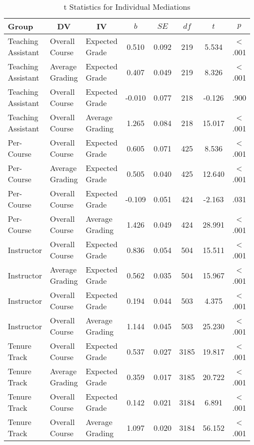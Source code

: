 \documentclass[man]{apa6}
\theoremstyle{definition}
\theoremstyle{definition}
\theoremstyle{definition}
\theoremstyle{remark}
\begin{document}
\begin{table}[tbp]
\begin{center}
\begin{threeparttable}
\caption{\label{tab:table-med-split}t Statistics for Individual Mediations}
\begin{tabular}{lllccccc}
\toprule
Group & \multicolumn{1}{c}{DV} & \multicolumn{1}{c}{IV} & \multicolumn{1}{c}{$b$} & \multicolumn{1}{c}{$SE$} & \multicolumn{1}{c}{$df$} & \multicolumn{1}{c}{$t$} & \multicolumn{1}{c}{$p$}\\
\midrule
Teaching Assistant & Overall Course & Expected Grade & 0.510 & 0.092 & 219 & 5.534 & < .001\\
Teaching Assistant & Average Grading & Expected Grade & 0.407 & 0.049 & 219 & 8.326 & < .001\\
Teaching Assistant & Overall Course & Expected Grade & -0.010 & 0.077 & 218 & -0.126 & .900\\
Teaching Assistant & Overall Course & Average Grading & 1.265 & 0.084 & 218 & 15.017 & < .001\\
Per-Course & Overall Course & Expected Grade & 0.605 & 0.071 & 425 & 8.536 & < .001\\
Per-Course & Average Grading & Expected Grade & 0.505 & 0.040 & 425 & 12.640 & < .001\\
Per-Course & Overall Course & Expected Grade & -0.109 & 0.051 & 424 & -2.163 & .031\\
Per-Course & Overall Course & Average Grading & 1.426 & 0.049 & 424 & 28.991 & < .001\\
Instructor & Overall Course & Expected Grade & 0.836 & 0.054 & 504 & 15.511 & < .001\\
Instructor & Average Grading & Expected Grade & 0.562 & 0.035 & 504 & 15.967 & < .001\\
Instructor & Overall Course & Expected Grade & 0.194 & 0.044 & 503 & 4.375 & < .001\\
Instructor & Overall Course & Average Grading & 1.144 & 0.045 & 503 & 25.230 & < .001\\
Tenure Track & Overall Course & Expected Grade & 0.537 & 0.027 & 3185 & 19.817 & < .001\\
Tenure Track & Average Grading & Expected Grade & 0.359 & 0.017 & 3185 & 20.722 & < .001\\
Tenure Track & Overall Course & Expected Grade & 0.142 & 0.021 & 3184 & 6.891 & < .001\\
Tenure Track & Overall Course & Average Grading & 1.097 & 0.020 & 3184 & 56.152 & < .001\\
\bottomrule
\end{tabular}
\end{threeparttable}
\end{center}
\end{table}
\end{document}
